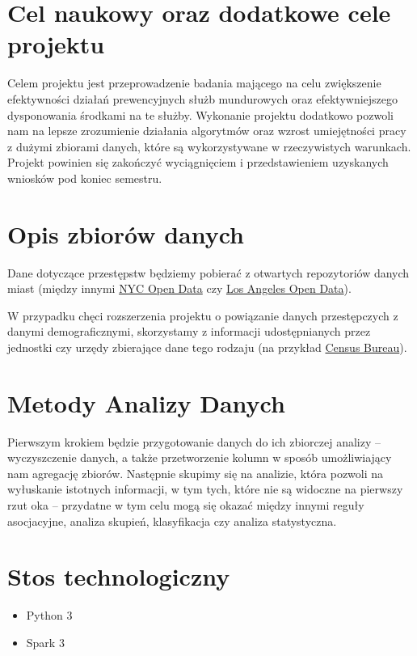 \documentclass[a4paper,11pt]{article}
\begin{document}

\section{Cel naukowy oraz dodatkowe cele projektu}

Celem projektu jest przeprowadzenie badania mającego na celu zwiększenie efektywności działań prewencyjnych służb mundurowych oraz efektywniejszego dysponowania środkami na te służby. Wykonanie projektu dodatkowo pozwoli nam na lepsze zrozumienie działania algorytmów oraz wzrost umiejętności pracy z dużymi zbiorami danych, które są wykorzystywane w rzeczywistych warunkach. Projekt powinien się zakończyć wyciągnięciem i przedstawieniem uzyskanych wniosków pod koniec semestru.


\section{Opis zbiorów danych} \label{sec:dataset}

Dane dotyczące przestępstw będziemy pobierać z otwartych repozytoriów danych miast (między innymi \href{https://opendata.cityofnewyork.us}{NYC Open Data} czy \href{https://data.lacity.org}{Los Angeles Open Data}).

W przypadku chęci rozszerzenia projektu o powiązanie danych przestępczych z danymi demograficznymi, skorzystamy z informacji udostępnianych przez jednostki czy urzędy zbierające dane tego rodzaju (na przykład \href{https://www.census.gov}{Census Bureau}). 


\section{Metody Analizy Danych}

Pierwszym krokiem będzie przygotowanie danych do ich zbiorczej analizy -- wyczyszczenie danych, a także przetworzenie kolumn w sposób umożliwiający nam agregację zbiorów. Następnie skupimy się na analizie, która pozwoli na wyłuskanie istotnych informacji, w tym tych, które nie są widoczne na pierwszy rzut oka -- przydatne w tym celu mogą się okazać między innymi reguły asocjacyjne, analiza skupień, klasyfikacja czy analiza statystyczna.


\section{Stos technologiczny}

\begin{itemize}
    \item Python 3
    \item Spark 3
\end{itemize}
\end{document}
